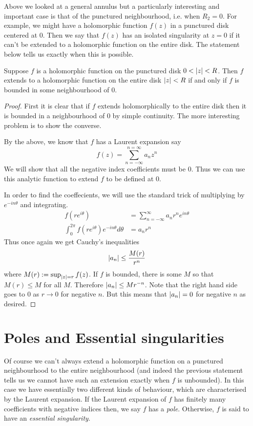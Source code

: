 Above we looked at a general annulus but a particularly interesting and important case is that of the punctured neighbourhood, i.e. when $R_2 = 0$. For example, we might have a holomorphic function $f(z)$ in a punctured disk centered at 0. Then we say that $f(z)$ has an isolated singularity at $z = 0$ if it can't be extended to a holomorphic function on the entire disk. The statement below tells us exactly when this is possible.
\begin{proposition}\label{prop:holom-extend}
Suppose $f$ is a holomorphic function on the punctured disk $0 < \left|z\right| < R$. Then $f$ extends to a holomorphic function on the entire disk $\left|z\right| < R$ if and only if $f$ is bounded in some neighbourhood of 0.
\end{proposition}
\begin{proof}
First it is clear that if $f$ extends holomorphically to the entire disk then it is bounded in a neighbourhood of 0 by simple continuity. The more interesting problem is to show the converse.

By the above, we know that $f$ has a Laurent expansion say
$$ f(z) = \sum_{n = -\infty}^{n = \infty} a_n z^n $$
We will show that all the negative index coefficients must be 0. Thus we can use this analytic function to extend $f$ to be defined at 0.

In order to find the coeffecients, we will use the standard trick of multiplying by $e^{-in\theta}$ and integrating.
\begin{align*}
    f(re^{i \theta}) &= \sum_{n = -\infty}^\infty a_n r^n e^{in \theta}\\
    \int_{0}^{2\pi} f(re^{i\theta})e^{- i n \theta} d \theta &= a_n r^n
\end{align*}
Thus once again we get Cauchy's inequalities
$$ \left|a_n\right| \leq \frac{M(r)}{r^n} $$
where $M(r) := \sup_{\left|z\right| = r} f(z)$. If $f$ is bounded, there is some $M$ so that $M(r) \leq M$ for all $M$. Therefore $\left|a_n\right| \leq M r^{-n}$. Note that the right hand side goes to 0 as $r \to 0$ for negative $n$. But this means that $\left|a_n\right| = 0$ for negative $n$ as desired. 
\end{proof}

\section{Poles and Essential singularities}
Of course we can't always extend a holomorphic function on a punctured neighbourhood to the entire neighbourhood (and indeed the previous statement tells us we cannot have such an extension exactly when $f$ is unbounded). In this case we have essentially two different kinds of behaviour, which are characterised by the Laurent expansion. If the Laurent expansion of $f$ has finitely many coefficients with negative indices then, we say $f$ has a \textit{pole}. Otherwise, $f$ is said to have an \textit{essential singularity}.

